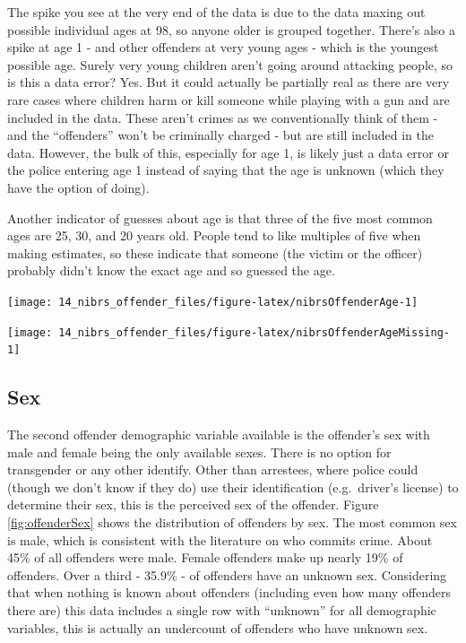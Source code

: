 \documentclass[
]{krantz}
\let\origfigure\figure
\let\endorigfigure\endfigure
\renewenvironment{figure}[1][2] {
    \expandafter\origfigure\expandafter[H]
} {
    \endorigfigure
}
\begin{document}
The spike you see at the very end of the data is due to the
data maxing out possible individual ages at 98, so anyone
older is grouped together. There's also a spike at age 1 -
and other offenders at very young ages - which is the
youngest possible age. Surely very young children aren't
going around attacking people, so is this a data error? Yes.
But it could actually be partially real as there are very
rare cases where children harm or kill someone while playing
with a gun and are included in the data. These aren't crimes
as we conventionally think of them - and the ``offenders''
won't be criminally charged - but are still included in the
data. However, the bulk of this, especially for age 1, is
likely just a data error or the police entering age 1
instead of saying that the age is unknown (which they have
the option of doing).

Another indicator of guesses about age is that three of the
five most common ages are 25, 30, and 20 years old. People
tend to like multiples of five when making estimates, so
these indicate that someone (the victim or the officer)
probably didn't know the exact age and so guessed the age.

\begin{figure}

{\centering \texttt{[image: 14\_nibrs\_offender\_files/figure-latex/nibrsOffenderAge-1]} 

}

\caption{The mean and median age of offenders, 1991-2022.}\label{fig:nibrsOffenderAge}
\end{figure}

\begin{figure}

{\centering \texttt{[image: 14\_nibrs\_offender\_files/figure-latex/nibrsOffenderAgeMissing-1]} 

}

\caption{The percent of offender's age that is unknown, 1991-2022.}\label{fig:nibrsOffenderAgeMissing}
\end{figure}

\subsection{Sex}\label{sex-1}

The second offender demographic variable available is the
offender's sex with male and female being the only available
sexes. There is no option for transgender or any other
identify. Other than arrestees, where police could (though
we don't know if they do) use their identification
(e.g.~driver's license) to determine their sex, this is the
perceived sex of the offender. Figure \ref{fig:offenderSex}
shows the distribution of offenders by sex. The most common
sex is male, which is consistent with the literature on who
commits crime. About 45\% of all offenders were male. Female
offenders make up nearly 19\% of offenders. Over a third -
35.9\% - of offenders have an unknown sex. Considering that
when nothing is known about offenders (including even how
many offenders there are) this data includes a single row
with ``unknown'' for all demographic variables, this is
actually an undercount of offenders who have unknown sex.
\end{document}
